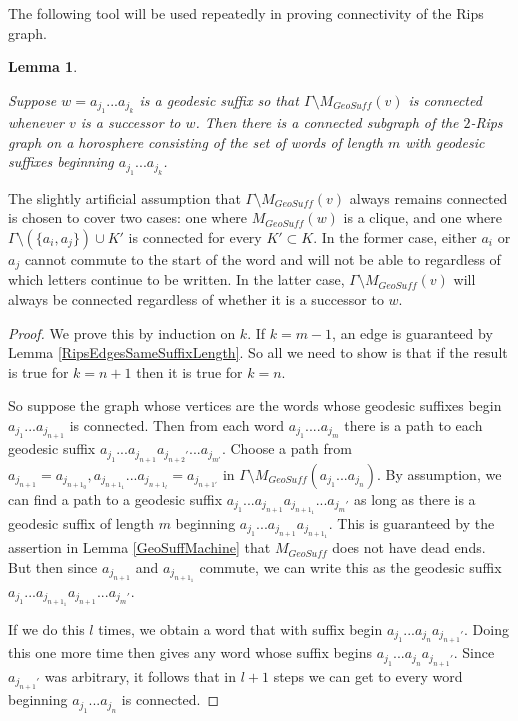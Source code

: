 \documentclass[10pt,a4paper]{amsart}
\newtheorem{lemma}[theorem]{Lemma}
\theoremstyle{definition}
\theoremstyle{remark}
\begin{document}
	The following tool will be used repeatedly in proving connectivity of the Rips graph.
	
	\begin{lemma} \label{RipsGraphPartialConnectivity}
		
		Suppose $w=a_{j_1}...a_{j_k}$ is a geodesic suffix so that $\Gamma\setminus M_{GeoSuff}(v)$ is connected whenever $v$ is a successor to $w$. Then there is a connected subgraph of the $2$-Rips graph on a horosphere consisting of the set of words of length $m$ with geodesic suffixes beginning $a_{j_1}...a_{j_k}$.
		
	\end{lemma}
	
	The slightly artificial assumption that $\Gamma\setminus M_{GeoSuff}(v)$ always remains connected is chosen to cover two cases: one where $M_{GeoSuff}(w)$ is a clique, and one where $\Gamma\setminus (\{a_i, a_j\})\cup K'$ is connected for every $K'\subset K$. In the former case, either $a_i$ or $a_j$ cannot commute to the start of the word and will not be able to regardless of which letters continue to be written. In the latter case, $\Gamma\setminus M_{GeoSuff}(v)$ will always be connected regardless of whether it is a successor to $w$.
	
	\begin{proof}
		
		We prove this by induction on $k$. If $k=m-1$, an edge is guaranteed by Lemma \ref{RipsEdgesSameSuffixLength}. So all we need to show is that if the result is true for $k=n+1$ then it is true for $k=n$.
		
		So suppose the graph whose vertices are the words whose geodesic suffixes begin \newline $a_{j_1}...a_{j_{n+1}}$ is connected. Then from each word $a_{j_1}....a_{j_m}$ there is a path to each geodesic suffix $a_{j_1}...a_{j_{n+1}}a_{j_{n+2}'}...a_{j_{m'}}$. Choose a path from $a_{j_{n+1}}=a_{j_{n+1_0}},a_{j_{n+1_1}}...a_{j_{n+1_l}}=a_{j_{n+1'}}$ in \newline $\Gamma\setminus M_{GeoSuff}(a_{j_1}...a_{j_n})$. By assumption, we can find a path to a geodesic suffix \newline $a_{j_1}...a_{j_{n+1}}a_{j_{n+1_1}}...a_{j_m'}$ as long as there is a geodesic suffix of length $m$ beginning \newline $a_{j_1}...a_{j_{n+1}}a_{j_{n+1_1}}$. This is guaranteed by the assertion in Lemma \ref{GeoSuffMachine} that $M_{GeoSuff}$ does not have dead ends. But then since $a_{j_{n+1}}$ and $a_{j_{n+1_1}}$ commute, we can write this as the geodesic suffix $a_{j_1}...a_{j_{n+1_1}}a_{j_{n+1}}...a_{j_{m}'}$. 
		
		If we do this $l$ times, we obtain a word that with suffix begin $a_{j_1}...a_{j_n}a_{j_{n+1}'}$. Doing this one more time then gives any word whose suffix begins $a_{j_1}...a_{j_n}a_{j_{n+1}'}$. Since $a_{j_{n+1}'}$ was arbitrary, it follows that in $l+1$ steps we can get to every word beginning $a_{j_1}...a_{j_n}$ is connected.
	\end{proof}
	
\end{document}
